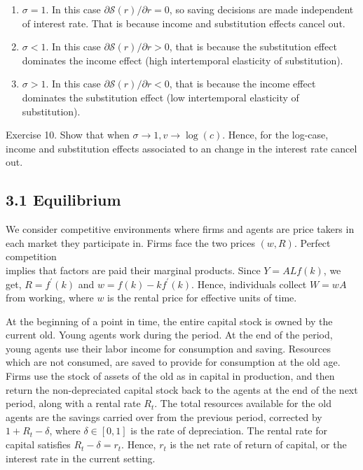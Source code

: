 \documentclass[10pt]{article}
\begin{document}
\begin{enumerate}
  \item $\sigma=1$. In this case $\partial \mathcal{S}(r) / \partial r=0$, so saving decisions are made independent of interest rate. That is because income and substitution effects cancel out.
  \item $\sigma<1$. In this case $\partial \mathcal{S}(r) / \partial r>0$, that is because the substitution effect dominates the income effect (high intertemporal elasticity of substitution).
  \item $\sigma>1$. In this case $\partial \mathcal{S}(r) / \partial r<0$, that is because the income effect dominates the substitution effect (low intertemporal elasticity of substitution).
\end{enumerate}

Exercise 10. Show that when $\sigma \rightarrow 1, v \rightarrow \log (c)$. Hence, for the log-case, income and substitution effects associated to an change in the interest rate cancel out.

\subsection*{3.1 Equilibrium}
We consider competitive environments where firms and agents are price takers in each market they participate in. Firms face the two prices $(w, R)$. Perfect competition\\
implies that factors are paid their marginal products. Since $Y=A L f(k)$, we get, $R=f^{\prime}(k)$ and $w=f(k)-k f^{\prime}(k)$. Hence, individuals collect $W=w A$ from working, where $w$ is the rental price for effective units of time.

At the beginning of a point in time, the entire capital stock is owned by the current old. Young agents work during the period. At the end of the period, young agents use their labor income for consumption and saving. Resources which are not consumed, are saved to provide for consumption at the old age. Firms use the stock of assets of the old as in capital in production, and then return the non-depreciated capital stock back to the agents at the end of the next period, along with a rental rate $R_{t}$. The total resources available for the old agents are the savings carried over from the previous period, corrected by $1+R_{t}-\delta$, where $\delta \in[0,1]$ is the rate of depreciation. The rental rate for capital satisfies $R_{t}-\delta=r_{t}$. Hence, $r_{t}$ is the net rate of return of capital, or the interest rate in the current setting.
\end{document}
